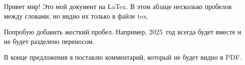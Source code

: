 \documentclass[a4paper,12pt]{article}
\begin{document}
Привет мир! Это   мой  документ на LaTex. В этом абзаце несколько пробелов между словами, но видно их только в файле tex.

Попробую добавить жесткий пробел. Например, 2025~год всегда будет вместе и не будет разделено переносом.

В конце предложения я поставлю комментарий, который не будет видно в PDF. %
\end{document}
